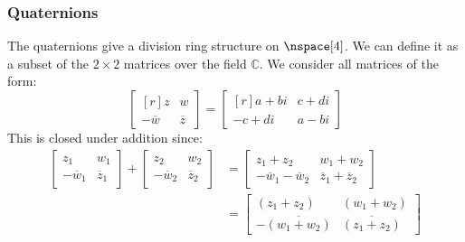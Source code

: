        \subsubsection{Quaternions}
            The quaternions give a division ring structure on $\nspace[4]$.
            We can define it as a subset of the $2\times{2}$ matrices over
            the field $\mathbb{C}$. We consider all matrices of the form:
            \begin{equation}
                \begin{bmatrix*}[r]
                    z&w\\
                    \minus\overline{w}&\overline{z}
                \end{bmatrix*}
                =
                \begin{bmatrix*}[r]
                    a+bi&c+di\\
                    \minus{c}+di&a-bi
                \end{bmatrix*}
            \end{equation}
            This is closed under addition since:
            \begin{subequations}
                \begin{align}
                    \begin{bmatrix}
                        z_{1}&w_{1}\\[1.2ex]
                        \minus\overline{w}_{1}&\overline{z}_{1}
                    \end{bmatrix}
                    +
                    \begin{bmatrix}
                        z_{2}&w_{2}\\[1.2ex]
                        \minus\overline{w}_{2}&\overline{z}_{2}
                    \end{bmatrix}
                    &=
                    \begin{bmatrix}
                        z_{1}+z_{2}&w_{1}+w_{2}\\[1.2ex]
                        \minus\overline{w}_{1}-\overline{w}_{2}
                        &\overline{z}_{1}+\overline{z}_{2}
                    \end{bmatrix}\\
                    &=
                    \begin{bmatrix}
                        (z_{1}+z_{2})&(w_{1}+w_{2})\\[1.2ex]
                        \minus\overline{(w_{1}+w_{2})}
                            &\overline{(z_{1}+z_{2})}
                    \end{bmatrix}
                \end{align}
            \end{subequations}
